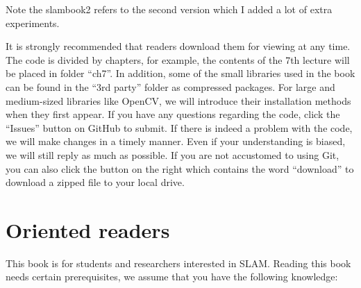 Note the slambook2 refers to the second version which I added a lot of extra experiments. 


It is strongly recommended that readers download them for viewing at any time. The code is divided by chapters, for example, the contents of the 7th lecture will be placed in folder ``ch7''. In addition, some of the small libraries used in the book can be found in the ``3rd party'' folder as compressed packages. For large and medium-sized libraries like OpenCV, we will introduce their installation methods when they first appear. If you have any questions regarding the code, click the ``Issues'' button on GitHub to submit. If there is indeed a problem with the code, we will make changes in a timely manner. Even if your understanding is biased, we will still reply as much as possible. If you are not accustomed to using Git, you can also click the button on the right which contains the word ``download'' to download a zipped file to your local drive.

\section{Oriented readers}

This book is for students and researchers interested in SLAM. Reading this book needs certain prerequisites, we assume that you have the following knowledge:

